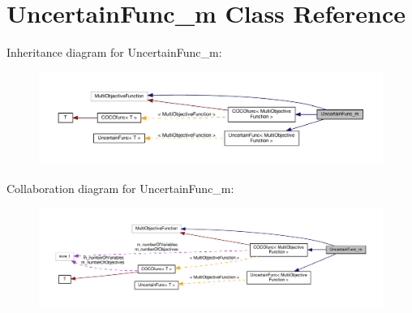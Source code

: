 \hypertarget{classUncertainFunc__m}{}\section{Uncertain\+Func\+\_\+m Class Reference}
\label{classUncertainFunc__m}


Inheritance diagram for Uncertain\+Func\+\_\+m\+:\nopagebreak
\begin{figure}[H]
\begin{center}
\leavevmode
\includegraphics[width=350pt]{classUncertainFunc__m__inherit__graph}
\end{center}
\end{figure}


Collaboration diagram for Uncertain\+Func\+\_\+m\+:\nopagebreak
\begin{figure}[H]
\begin{center}
\leavevmode
\includegraphics[width=350pt]{classUncertainFunc__m__coll__graph}
\end{center}
\end{figure}
